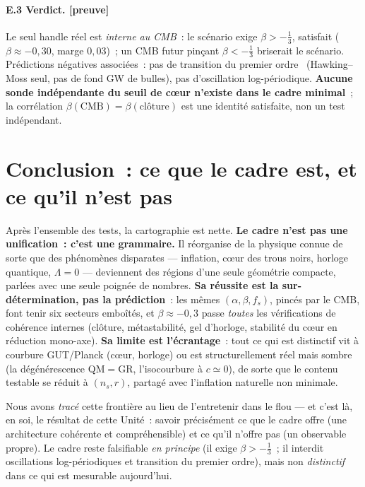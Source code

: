 \documentclass[11pt]{article}
\newcommand{\preuve}{{\small\textbf{[preuve]}}}
\theoremstyle{definition}
\begin{document}
\paragraph{E.3 Verdict. \preuve}
Le seul handle r\'eel est \emph{interne au CMB}~: le sc\'enario exige $\beta>-\tfrac13$, satisfait
($\beta\approx-0{,}30$, marge $0{,}03$)~; un CMB futur pin\c{c}ant $\beta<-\tfrac13$ briserait le
sc\'enario. Pr\'edictions n\'egatives associ\'ees~: pas de transition du premier ordre~\cite{ColemanDeLuccia1980,HawkingMoss1982} (Hawking--Moss
seul, pas de fond GW de bulles), pas d'oscillation log-p\'eriodique. \textbf{Aucune sonde ind\'ependante du
seuil de c\oe ur n'existe dans le cadre minimal}~; la corr\'elation $\beta(\text{CMB})=\beta(\text{cl\^oture})$
est une identit\'e satisfaite, non un test ind\'ependant.

\section*{Conclusion~: ce que le cadre est, et ce qu'il n'est pas}
Apr\`es l'ensemble des tests, la cartographie est nette. \textbf{Le cadre n'est pas une unification~: c'est
une grammaire.} Il r\'eorganise de la physique connue de sorte que des ph\'enom\`enes disparates ---
inflation, c\oe ur des trous noirs, horloge quantique, $\Lambda=0$ --- deviennent des r\'egions d'une seule
g\'eom\'etrie compacte, parl\'ees avec une seule poign\'ee de nombres. \textbf{Sa r\'eussite est la
sur-d\'etermination, pas la pr\'ediction}~: les m\^emes $(\alpha,\beta,f_s)$, pinc\'es par le CMB, font
tenir six secteurs emboît\'es, et $\beta\approx-0{,}3$ passe \emph{toutes} les v\'erifications de
coh\'erence internes (cl\^oture, m\'etastabilit\'e, gel d'horloge, stabilit\'e du c\oe ur en r\'eduction mono-axe). \textbf{Sa
limite est l'\'ecrantage}~: tout ce qui est distinctif vit \`a courbure GUT/Planck (c\oe ur, horloge) ou
est structurellement r\'eel mais sombre (la d\'eg\'en\'erescence QM$=$GR, l'isocourbure \`a $c\simeq0$), de
sorte que le contenu testable se r\'eduit \`a $(n_s,r)$, partag\'e avec l'inflation naturelle non minimale.

Nous avons \emph{trac\'e} cette fronti\`ere au lieu de l'entretenir dans le flou --- et c'est l\`a, en soi,
le r\'esultat de cette Unit\'e~: savoir pr\'ecis\'ement ce que le cadre offre (une architecture coh\'erente
et compr\'ehensible) et ce qu'il n'offre pas (un observable propre). Le cadre reste falsifiable \emph{en
principe} (il exige $\beta>-\tfrac13$~; il interdit oscillations log-p\'eriodiques et transition du premier
ordre), mais non \emph{distinctif} dans ce qui est mesurable aujourd'hui.
\end{document}
